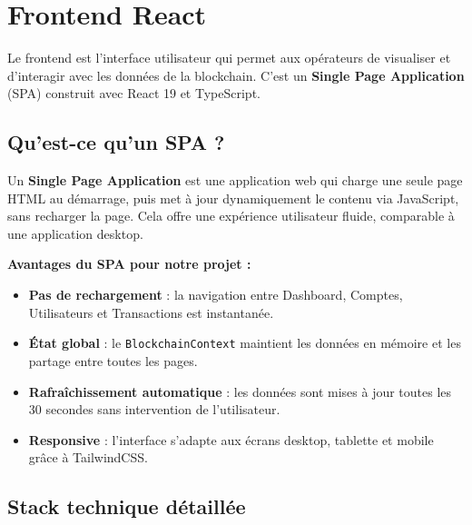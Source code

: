 \documentclass[12pt,a4paper,twoside]{report}
\begin{document}
\chapter{Frontend React}

Le frontend est l'interface utilisateur qui permet aux opérateurs de visualiser et d'interagir avec les données de la blockchain. C'est un \textbf{Single Page Application} (SPA) construit avec React 19 et TypeScript.

\section{Qu'est-ce qu'un SPA ?}

Un \textbf{Single Page Application} est une application web qui charge une seule page HTML au démarrage, puis met à jour dynamiquement le contenu via JavaScript, sans recharger la page. Cela offre une expérience utilisateur fluide, comparable à une application desktop.

\begin{infobox}
\textbf{Avantages du SPA pour notre projet :}
\begin{itemize}
    \item \textbf{Pas de rechargement} : la navigation entre Dashboard, Comptes, Utilisateurs et Transactions est instantanée.
    \item \textbf{État global} : le \texttt{BlockchainContext} maintient les données en mémoire et les partage entre toutes les pages.
    \item \textbf{Rafraîchissement automatique} : les données sont mises à jour toutes les 30 secondes sans intervention de l'utilisateur.
    \item \textbf{Responsive} : l'interface s'adapte aux écrans desktop, tablette et mobile grâce à TailwindCSS.
\end{itemize}
\end{infobox}

\section{Stack technique détaillée}
\end{document}
